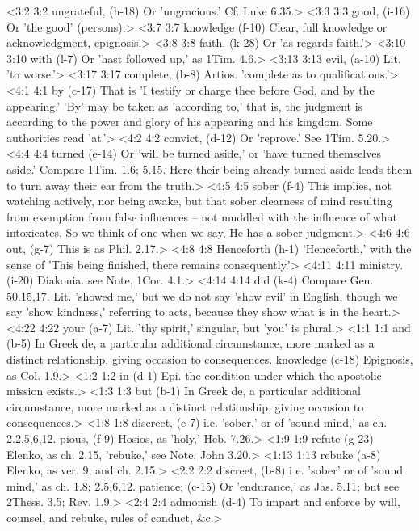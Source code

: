 <3:2 3:2  ungrateful, (h-18)  Or 'ungracious.' Cf. Luke 6.35.>
<3:3 3:3  good, (i-16)  Or 'the good' (persons).>
<3:7 3:7  knowledge (f-10)  Clear, full knowledge or acknowledgment, epignosis.>
<3:8 3:8  faith. (k-28)  Or 'as regards faith.'>
<3:10 3:10  with (l-7)  Or 'hast followed up,' as 1Tim. 4.6.>
<3:13 3:13  evil, (a-10)  Lit. 'to worse.'>
<3:17 3:17  complete, (b-8)  Artios. 'complete as to qualifications.'>
<4:1 4:1  by (c-17)  That is 'I testify or charge thee before God, and by the  appearing.' 'By' may be taken as 'according to,' that is, the  judgment is according to the power and glory of his appearing  and his kingdom. Some authorities read 'at.'>
<4:2 4:2  convict, (d-12)  Or 'reprove.' See 1Tim. 5.20.>
<4:4 4:4  turned (e-14)  Or 'will be turned aside,' or 'have turned themselves aside.'  Compare 1Tim. 1.6; 5.15. Here their being already turned aside  leads them to turn away their ear from the truth.>
<4:5 4:5  sober (f-4)  This implies, not watching actively, nor being awake, but  that sober clearness of mind resulting from exemption from  false influences -- not muddled with the influence of what  intoxicates. So we think of one when we say, He has a sober  judgment.>
<4:6 4:6  out, (g-7)  This is as Phil. 2.17.>
<4:8 4:8  Henceforth (h-1)  'Henceforth,' with the sense of 'This being finished, there  remains consequently.'>
<4:11 4:11  ministry. (i-20)  Diakonia. see Note, 1Cor. 4.1.>
<4:14 4:14  did (k-4)  Compare Gen. 50.15,17. Lit. 'showed me,' but we do not say  'show evil' in English, though we say 'show kindness,'  referring to acts, because they show what is in the heart.>
<4:22 4:22  your (a-7)  Lit. 'thy spirit,' singular, but 'you' is plural.>
<1:1 1:1  and (b-5)  In Greek de, a particular additional circumstance, more  marked as a distinct relationship, giving occasion to  consequences.
  knowledge (c-18)  Epignosis, as Col. 1.9.>
<1:2 1:2  in (d-1)  Epi. the condition under which the apostolic mission  exists.>
<1:3 1:3  but (b-1)  In Greek de, a particular additional circumstance, more  marked as a distinct relationship, giving occasion to  consequences.>
<1:8 1:8  discreet, (e-7)  i.e. 'sober,' or of 'sound mind,' as ch. 2.2,5,6,12.
  pious, (f-9)  Hosios, as 'holy,' Heb. 7.26.>
<1:9 1:9  refute (g-23)  Elenko, as ch. 2.15, 'rebuke,' see Note, John 3.20.>
<1:13 1:13  rebuke (a-8)  Elenko, as ver. 9, and ch. 2.15.>
<2:2 2:2  discreet, (b-8)  i e. 'sober' or of 'sound mind,' as ch. 1.8; 2.5,6,12.
  patience; (c-15)  Or 'endurance,' as Jas. 5.11; but see 2Thess. 3.5; Rev. 1.9.>
<2:4 2:4  admonish (d-4)  To impart and enforce by will, counsel, and rebuke, rules of  conduct, &c.>
